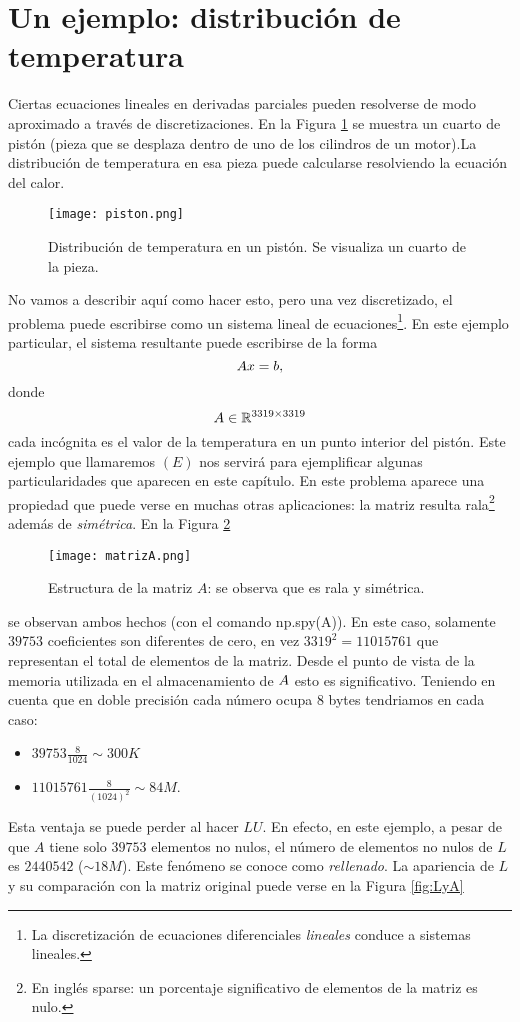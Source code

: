 \section{Un ejemplo: distribución de temperatura}
\label{sec:piston}
Ciertas ecuaciones lineales en derivadas parciales pueden resolverse de modo aproximado a través de discretizaciones. En la Figura \ref{fig:disc_piston} se muestra un cuarto de pistón (pieza que se desplaza dentro de uno de los cilindros de un motor).La distribución de temperatura en esa pieza puede calcularse resolviendo la ecuación del calor.  
\begin{figure}[h]
\centering\texttt{[image: piston.png]}
\label{fig:disc_piston}
\caption{Distribución de temperatura en un pistón. Se visualiza un cuarto de la pieza.}
\end{figure}
No vamos a describir aquí como hacer esto, pero una vez discretizado, el problema puede escribirse como un sistema lineal de ecuaciones\footnote{La discretización de ecuaciones diferenciales \emph{lineales} conduce a sistemas lineales.}. En este ejemplo particular, el sistema resultante  puede escribirse de la forma
 $$
 \Ab\xb=\bb,
 $$
 donde
 $$\Ab\in \R^{3319\times 3319}$$
cada incógnita es el valor de la temperatura en un punto interior del pistón. Este ejemplo que llamaremos $(E)$ nos servirá para ejemplificar algunas particularidades que aparecen en este capítulo. En este problema aparece una propiedad que puede verse en muchas otras aplicaciones: la matriz resulta rala\footnote{ En inglés sparse: un porcentaje significativo de elementos de la matriz es nulo.} además de \emph{simétrica}. En la Figura \ref{fig:matrizA}
\begin{figure}[h]
\label{fig:matrizA}
\centering\texttt{[image: matrizA.png]}
\caption{Estructura de la matriz $A$: se observa que es rala y simétrica.}
\end{figure}
se observan ambos hechos (con el comando np.spy(A)). En este caso, solamente $39753$ coeficientes son diferentes de cero, en vez $3319^2=11015761$ que representan el total de elementos de la matriz. Desde  el punto de vista de la memoria utilizada en el almacenamiento de $\Ab$ esto es significativo. Teniendo en cuenta que en doble precisión cada número ocupa 8 bytes tendriamos en cada caso:
\begin{itemize}
 \item $39753\frac{8}{1024}\sim 300K$
 \item $11015761 \frac{8}{(1024)^2}\sim 84M$.
\end{itemize}
Esta ventaja se puede perder al hacer $LU$.
En efecto, en este ejemplo, a pesar de que $A$ tiene solo $39753$ elementos no nulos, el número de elementos no nulos de $L$ es $2440542$ ($\sim 18M$). Este fenómeno se conoce como \emph{rellenado}. La apariencia de $L$ y su comparación con la matriz original puede verse en la Figura \ref{fig:LyA}

